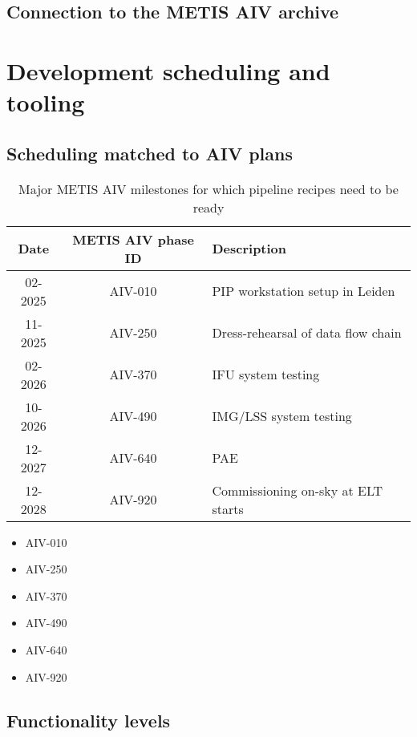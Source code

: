 \documentclass[a4paper]{spie}  %
\begin{document}
\subsection{Connection to the METIS AIV archive}
\label{ssec:imp_archive}



\section{Development scheduling and tooling}
\label{sec:development}

\subsection{Scheduling matched to AIV plans}
\label{ssec:dev_aiv}

\begin{table}[]
    \centering
\caption{Major METIS AIV milestones for which pipeline recipes need to be ready}
\label{tab:dev_aiv_milestones}
    \begin{tabular}{c|c|l}
    \hline
    \hline
         Date &   METIS AIV phase ID & Description\\
         \hline
         02-2025 &   AIV-010&PIP workstation setup in Leiden\\
         11-2025 &   AIV-250&Dress-rehearsal of data flow chain\\
 02-2026 & AIV-370&IFU system testing\\
 10-2026 &  AIV-490&IMG/LSS system testing\\
 12-2027 & AIV-640&PAE\\
 12-2028 & AIV-920&Commissioning on-sky at ELT starts\\
 \hline
 \end{tabular}
      
\end{table}

\begin{itemize}
    \item AIV-010
    \item AIV-250
    \item AIV-370
    \item AIV-490
    \item AIV-640
    \item AIV-920
\end{itemize}



\subsection{Functionality levels}
\label{ssec:dev_levels}
  
\end{document}
